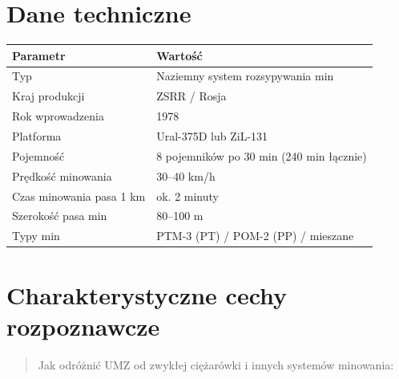 \documentclass[12pt,openany,oneside]{book}
\begin{document}
\section{Dane techniczne}\label{dane-techniczne-118}

\begin{longtable}[]{@{}ll@{}}
\toprule\noalign{}
Parametr & Wartość \\
\midrule\noalign{}
\endhead
\bottomrule\noalign{}
\endlastfoot
Typ & Naziemny system rozsypywania min \\
Kraj produkcji & ZSRR / Rosja \\
Rok wprowadzenia & 1978 \\
Platforma & Ural-375D lub ZiL-131 \\
Pojemność & 8 pojemników po 30 min (240 min łącznie) \\
Prędkość minowania & 30--40 km/h \\
Czas minowania pasa 1 km & ok. 2 minuty \\
Szerokość pasa min & 80--100 m \\
Typy min & PTM-3 (PT) / POM-2 (PP) / mieszane \\
\end{longtable}

\section{Charakterystyczne cechy
rozpoznawcze}\label{charakterystyczne-cechy-rozpoznawcze-118}

\begin{quote}
Jak odróżnić UMZ od zwykłej ciężarówki i innych systemów minowania:
\end{quote}
\end{document}
